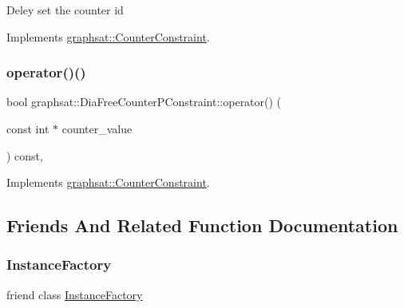 Deley set the counter id 

Implements \mbox{\hyperlink{classgraphsat_1_1_counter_constraint_aa467ff66b37a1cbc69f5eddb269aaa0d}{graphsat\+::\+Counter\+Constraint}}.

\mbox{\label{classgraphsat_1_1_dia_free_counter_p_constraint_a02255677df41a98992d4150923d3e169}} 
\subsubsection{\texorpdfstring{operator()()}{operator()()}}
{\footnotesize\ttfamily bool graphsat\+::\+Dia\+Free\+Counter\+P\+Constraint\+::operator() (\begin{DoxyParamCaption}\item[{const int $\ast$}]{counter\+\_\+value }\end{DoxyParamCaption}) const\hspace{0.3cm}{\ttfamily [inline]}, {\ttfamily [virtual]}}



Implements \mbox{\hyperlink{classgraphsat_1_1_counter_constraint_a1fb82c50097b34656ef5ca319dd352da}{graphsat\+::\+Counter\+Constraint}}.



\subsection{Friends And Related Function Documentation}
\mbox{\label{classgraphsat_1_1_dia_free_counter_p_constraint_ad4b3c25c041701ae56dc1e78df779d2f}} 
\subsubsection{\texorpdfstring{InstanceFactory}{InstanceFactory}}
{\footnotesize\ttfamily friend class \mbox{\hyperlink{classgraphsat_1_1_instance_factory}{Instance\+Factory}}\hspace{0.3cm}{\ttfamily [friend]}}



